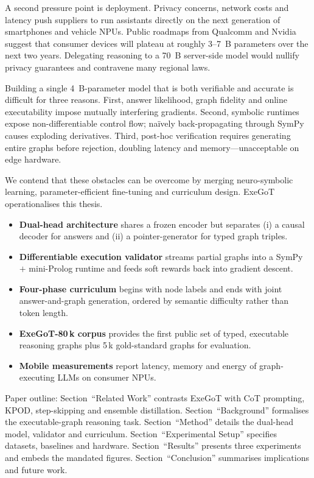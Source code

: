 \documentclass{article} %
\begin{document}
A second pressure point is deployment. Privacy concerns, network costs and latency push suppliers to run assistants directly on the next generation of smartphones and vehicle NPUs. Public roadmaps from Qualcomm and Nvidia suggest that consumer devices will plateau at roughly 3--7~B parameters over the next two years. Delegating reasoning to a 70~B server-side model would nullify privacy guarantees and contravene many regional laws.

Building a single 4~B-parameter model that is both verifiable and accurate is difficult for three reasons. First, answer likelihood, graph fidelity and online executability impose mutually interfering gradients. Second, symbolic runtimes expose non-differentiable control flow; naïvely back-propagating through SymPy causes exploding derivatives. Third, post-hoc verification requires generating entire graphs before rejection, doubling latency and memory---unacceptable on edge hardware.

We contend that these obstacles can be overcome by merging neuro-symbolic learning, parameter-efficient fine-tuning and curriculum design. ExeGoT operationalises this thesis.

\begin{itemize}
  \item \textbf{Dual-head architecture} shares a frozen encoder but separates (i) a causal decoder for answers and (ii) a pointer-generator for typed graph triples.
  \item \textbf{Differentiable execution validator} streams partial graphs into a SymPy $+$ mini-Prolog runtime and feeds soft rewards back into gradient descent.
  \item \textbf{Four-phase curriculum} begins with node labels and ends with joint answer-and-graph generation, ordered by semantic difficulty rather than token length.
  \item \textbf{ExeGoT-80\,k corpus} provides the first public set of typed, executable reasoning graphs plus 5\,k gold-standard graphs for evaluation.
  \item \textbf{Mobile measurements} report latency, memory and energy of graph-executing LLMs on consumer NPUs.
\end{itemize}

Paper outline: Section~``Related Work'' contrasts ExeGoT with CoT prompting, KPOD, step-skipping and ensemble distillation. Section~``Background'' formalises the executable-graph reasoning task. Section~``Method'' details the dual-head model, validator and curriculum. Section~``Experimental Setup'' specifies datasets, baselines and hardware. Section~``Results'' presents three experiments and embeds the mandated figures. Section~``Conclusion'' summarises implications and future work.
\end{document}
